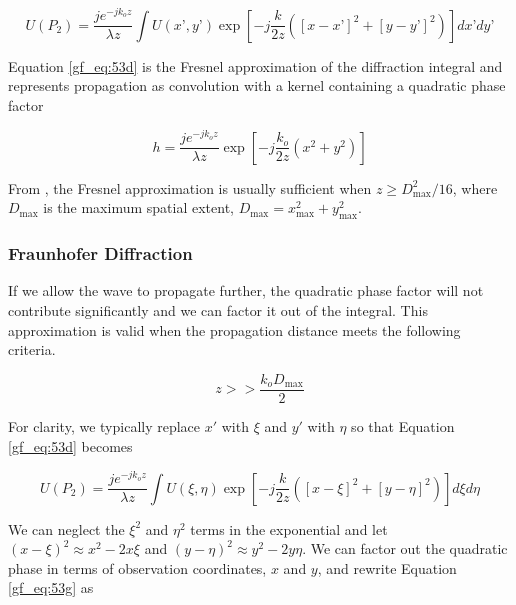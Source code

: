 \begin{equation}
\boxed{U(P_2) =\frac{je^{-jk_oz}}{\lambda z}\int U(x’,y’)\exp\left[-j \frac{k}{2z}\left([x-x’]^2 + [y-y’]^2 \right) \right]dx’ dy’}
\label{gf_eq:53d}
\end{equation}
\renewcommand{\baselinestretch}{2} \small\normalsize

Equation \ref{gf_eq:53d} is the Fresnel approximation of the diffraction integral and represents propagation as convolution with a kernel containing a quadratic phase factor

\begin{equation}
h = \frac{je^{-jk_o z}}{\lambda z}\exp\left[-j\frac{k_o}{2z}\left(x^2 + y^2 \right) \right]
\label{gf_eq:53e}
\end{equation}
\renewcommand{\baselinestretch}{2} \small\normalsize

From \cite{goodman_fourier}, the Fresnel approximation is usually sufficient when $z\geq D_{\text{max}}^2/16$, where $D_{\text{max}}$ is the maximum spatial extent, $D_{\text{max}} = x_{\text{max}}^2 + y_{\text{max}}^2$. 

\subsubsection{Fraunhofer Diffraction}
If we allow the wave to propagate further, the quadratic phase factor will not contribute significantly and we can factor it out of the integral. This approximation is valid when the propagation distance meets the following criteria.

\begin{equation}
z >> \frac{k_oD_{\text{max}}}{2}
\label{gf_eq:53f}
\end{equation}
\renewcommand{\baselinestretch}{2} \small\normalsize

For clarity, we typically replace $x'$ with $\xi$ and $y'$ with $\eta$ so that Equation \ref{gf_eq:53d} becomes

\begin{equation}
U(P_2) =\frac{je^{-jk_oz}}{\lambda z}\int U(\xi,\eta)\exp\left[-j \frac{k}{2z}\left([x-\xi]^2 + [y-\eta]^2 \right) \right]d\xi d\eta
\label{gf_eq:53g}
\end{equation}
\renewcommand{\baselinestretch}{2} \small\normalsize

We can neglect the $\xi^2$ and $\eta^2$ terms in the exponential and let $(x-\xi)^2 \approx x^2-2x\xi$ and $(y-\eta)^2\approx y^2-2y\eta$. We can factor out the quadratic phase in terms of observation coordinates, $x$ and $y$, and rewrite Equation \ref{gf_eq:53g} as

